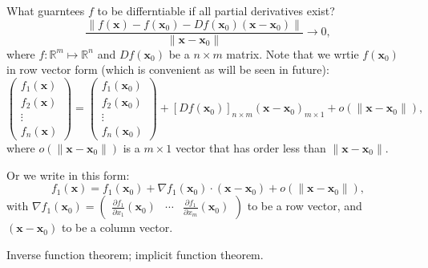 What guarntees $f$ to be differntiable if all partial derivatives exist?
\[
\frac{\|f(\bm x) - f(\bm x_0) - Df(\bm x_0)(\bm x-\bm x_0)\|}{\|\bm x-\bm x_0\|}\to0,
\]
where $f:\mathbb{R}^m\mapsto\mathbb{R}^n$ and $Df(\bm x_0)$ be a $n\times m$ matrix. Note that we wrtie $f(\bm x_0)$ in row vector form (which is convenient as will be seen in future):
\[
\begin{pmatrix}
f_1(\bm x)\\
f_2(\bm x)\\
\vdots\\
f_n(\bm x)
\end{pmatrix}=
\begin{pmatrix}
f_1(\bm x_0)\\
f_2(\bm x_0)\\
\vdots\\
f_n(\bm x_0)
\end{pmatrix}
+[{Df(\bm x_0)}]_{n\times m}(\bm x-\bm x_0)_{m\times 1}
+o(\|\bm x-\bm x_0\|),
\]
where $o(\|\bm x-\bm x_0\|)$ is a $m\times 1$ vector that has order less than $\|\bm x-\bm x_0\|$.

Or we write in this form:
\[
f_1(\bm x)=f_1(\bm x_0)+\nabla f_1(\bm x_0)\cdot (\bm x-\bm x_0)+o(\|\bm x-\bm x_0\|),
\]
with $\nabla f_1(\bm x_0) = \begin{pmatrix}
\frac{\partial f_1}{\partial x_1}(\bm x_0)
&
\cdots
&
\frac{\partial f_1}{\partial x_m}(\bm x_0)
\end{pmatrix}$ to be a row vector, and $(\bm x-\bm x_0)$ to be a column vector.

Inverse function theorem; implicit function theorem.

